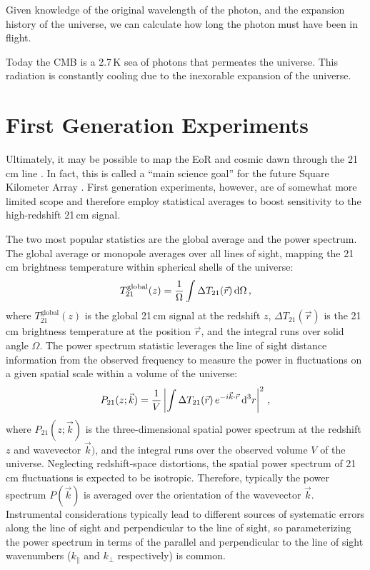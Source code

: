 \begin{bibunit}
Given knowledge of the
original wavelength of the photon, and the expansion history of the universe, we can calculate how
long the photon must have been in flight.


Today the CMB is a 2.7\,K sea of photons that permeates the universe. This radiation is constantly
cooling due to the inexorable expansion of the universe.




\section{First Generation Experiments}

Ultimately, it may be possible to map the EoR and cosmic dawn through the 21\,cm line
\citep{1997ApJ...475..429M}. In fact, this is called a ``main science goal'' for the future Square
Kilometer Array \citep[SKA;][]{2013ExA....36..235M}.  First generation experiments, however, are of
somewhat more limited scope and therefore employ statistical averages to boost sensitivity to the
high-redshift 21\,cm signal.

The two most popular statistics are the global average and the power spectrum. The global average or
monopole averages over all lines of sight, mapping the 21\,cm brightness temperature within
spherical shells of the universe:
\begin{equation}
    T^\text{global}_{21}(z) = \frac{1}{\Omega}\int \Delta T_{21}(\vec{r}) \, {\textrm d}\Omega \,,
\end{equation}
where $T^\text{global}_{21}(z)$ is the global 21\,cm signal at the redshift $z$, $\Delta
T_{21}(\vec{r})$ is the 21\,cm brightness temperature at the position $\vec{r}$, and the integral
runs over solid angle $\Omega$.  The power spectrum statistic leverages the line of sight distance
information from the observed frequency to measure the power in fluctuations on a given spatial
scale within a volume of the universe:
\begin{equation}
    P_{21}(z; \vec{k}) =
        \frac{1}{V}\left|
        \int \Delta T_{21}(\vec{r}) \, e^{-i\vec{k}\cdot\vec{r}} \, {\textrm d}^3r
        \right|^2\,,
\end{equation}
where $P_{21}(z; \vec{k})$ is the three-dimensional spatial power spectrum at the redshift $z$ and
wavevector $\vec{k})$, and the integral runs over the observed volume $V$ of the universe.
Neglecting redshift-space distortions, the spatial power spectrum of 21\,cm fluctuations is expected
to be isotropic. Therefore, typically the power spectrum $P(\vec{k})$ is averaged over the
orientation of the wavevector $\vec{k}$. Instrumental considerations typically lead to different
sources of systematic errors along the line of sight and perpendicular to the line of sight, so
parameterizing the power spectrum in terms of the parallel and perpendicular to the line of sight
wavenumbers ($k_\parallel$ and $k_\perp$ respectively) is common.


\end{bibunit}
